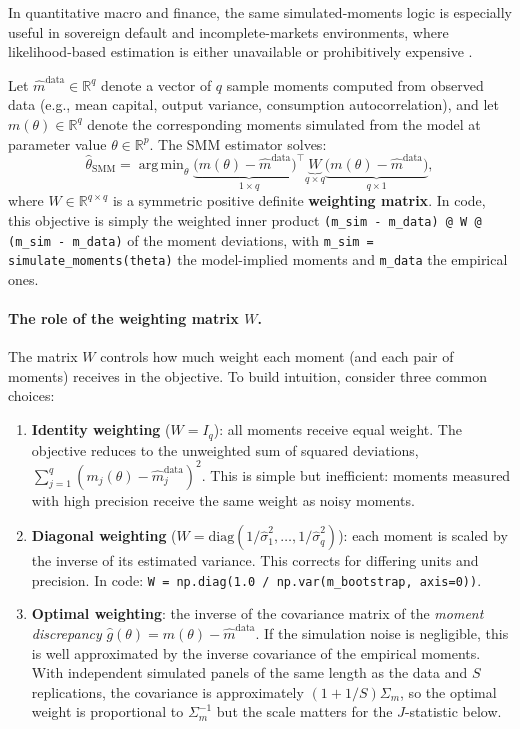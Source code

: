 \documentclass[11pt,a4paper]{report}
\newcommand{\R}{\mathbb{R}}
\DeclareMathOperator*{\argmin}{arg\,min}
\newcommand{\emphc}[1]{\textcolor{harvardcrimson}{\textbf{#1}}}
\begin{document}
In quantitative macro and finance, the same simulated-moments logic is especially useful in sovereign default and incomplete-markets environments, where likelihood-based estimation is either unavailable or prohibitively expensive \citep{arellano2008default}.

Let $\hat{m}^\mathrm{data} \in \R^q$ denote a vector of $q$ sample moments computed from observed data (e.g., mean capital, output variance, consumption autocorrelation), and let $m(\theta) \in \R^q$ denote the corresponding moments simulated from the model at parameter value $\theta \in \R^p$.  The SMM estimator solves:
\begin{equation}
\hat{\theta}_\mathrm{SMM}
=
\argmin_\theta
\underbrace{\bigl(m(\theta)-\hat m^\mathrm{data}\bigr)^\top}_{1\times q}
\underbrace{W}_{q\times q}
\underbrace{\bigl(m(\theta)-\hat m^\mathrm{data}\bigr)}_{q\times 1},
\label{eq:smm_objective}
\end{equation}
where $W \in \R^{q \times q}$ is a symmetric positive definite \emphc{weighting matrix}.  In code, this objective is simply the weighted inner product \texttt{(m\_sim - m\_data) @ W @ (m\_sim - m\_data)} of the moment deviations, with \texttt{m\_sim = simulate\_moments(theta)} the model-implied moments and \texttt{m\_data} the empirical ones.

\paragraph{The role of the weighting matrix $W$.}
The matrix $W$ controls how much weight each moment (and each pair of moments) receives in the objective.  To build intuition, consider three common choices:

\begin{enumerate}[itemsep=3pt]
\item \textbf{Identity weighting} ($W = I_q$): all moments receive equal weight.  The objective reduces to the unweighted sum of squared deviations, $\sum_{j=1}^q (m_j(\theta) - \hat{m}_j^\mathrm{data})^2$.  This is simple but inefficient: moments measured with high precision receive the same weight as noisy moments.

\item \textbf{Diagonal weighting} ($W = \mathrm{diag}(1/\hat{\sigma}_1^2, \ldots, 1/\hat{\sigma}_q^2)$): each moment is scaled by the inverse of its estimated variance.  This corrects for differing units and precision.  In code: \texttt{W = np.diag(1.0 / np.var(m\_bootstrap, axis=0))}.

\item \textbf{Optimal weighting}: the inverse of the covariance matrix of the \emph{moment discrepancy} $\hat g(\theta)=m(\theta)-\hat m^\mathrm{data}$.  If the simulation noise is negligible, this is well approximated by the inverse covariance of the empirical moments.  With independent simulated panels of the same length as the data and $S$ replications, the covariance is approximately $(1+1/S)\Sigma_m$, so the optimal weight is proportional to $\Sigma_m^{-1}$ but the scale matters for the $J$-statistic below.
\end{enumerate}
\end{document}
